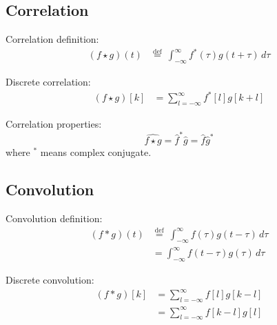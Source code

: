\documentclass[12pt]{article}
\numberwithin{equation}{section}
\begin{document}
\subsection{Correlation}
Correlation definition:
\begin{align} \label{eq:conv}
	(f \star g )(t) &\stackrel{\mathrm{def}}{=}\ \int_{-\infty}^\infty f^*(\tau) g(t + \tau) \, d\tau 
\end{align} \par
Discrete correlation:
\begin{align}
	(f \star g)[k] &= \sum_{l=-\infty}^\infty f^*[l] g[k + l] 
\end{align} \par
Correlation properties:
\begin{equation} \label{eq:correlationproperty1}
	\widehat{f \star g}=\hat{f}^* \hat{g}=\hat{f} \hat{g}^*
\end{equation}
where $^*$ means complex conjugate. \par
\subsection{Convolution}
Convolution definition:
\begin{align} \label{eq:conv}
	(f * g )(t) &\stackrel{\mathrm{def}}{=}\ \int_{-\infty}^\infty f(\tau) g(t - \tau) \, d\tau \\
	&= \int_{-\infty}^\infty f(t-\tau) g(\tau)\, d\tau
\end{align} \par

Discrete convolution: 
\begin{align}
	(f * g)[k] &= \sum_{l=-\infty}^\infty f[l] g[k - l] \\
			&= \sum_{l=-\infty}^\infty f[k-l] g[l]
\end{align} \par
\end{document}
